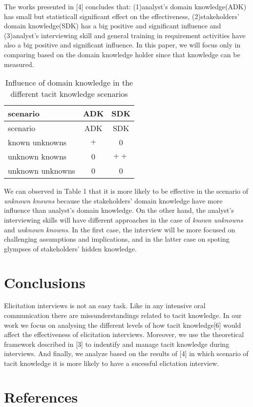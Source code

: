 \documentclass[]{llncs}
\begin{document}
The works presented in {[}4{]} concludes that: (1)analyst's domain
knowledge(ADK) has small but statisticall significant effect on the
effectiveness, (2)stakeholders' domain knowledge(SDK) has a big positive
and significant influence and (3)analyst's interviewing skill and
general training in requirement activities have also a big positive and
significant influence. In this paper, we will focus only in comparing
based on the domain knowledge holder since that knowledge can be
measured.

\begin{longtable}[]{@{}lcc@{}}
\caption{Influence of domain knowledge in the different tacit knowledge
scenarios}\tabularnewline
\toprule
scenario & ADK & SDK\tabularnewline
\midrule
\endfirsthead
\toprule
scenario & ADK & SDK\tabularnewline
\midrule
\endhead
known unknowns & \(+\) & 0\tabularnewline
unknown knowns & 0 & \(++\)\tabularnewline
unknown unknowns & 0 & 0\tabularnewline
\bottomrule
\end{longtable}

We can observed in Table 1 that it is more likely to be effective in the
scenario of \emph{unknown knowns} because the stakeholders' domain
knowledge have more influence than analyst's domain knowledge. On the
other hand, the analyst's interviewing skills will have different
approaches in the case of \emph{known unknowns} and \emph{unknown
knowns}. In the first case, the interview will be more focused on
challenging assumptions and implications, and in the latter case on
spoting glympses of stakeholders' hidden knowledge.

\hypertarget{conclusions}{%
\section{Conclusions}\label{conclusions}}

Elicitation interviews is not an easy task. Like in any intensive oral
communication there are missunderstandings related to tacit knowledge.
In our work we focus on analysing the different levels of how tacit
knowledge{[}6{]} would affect the effectiveness of elicitation
interviews. Moreover, we use the theoretical framework described in
{[}3{]} to indentify and manage tacit knowledge during interviews. And
finally, we analyze based on the results of {[}4{]} in which scenario of
tacit knowledge it is more likely to have a sucessful elictation
interview.

\hypertarget{references}{%
\section*{References}\label{references}}
\end{document}
